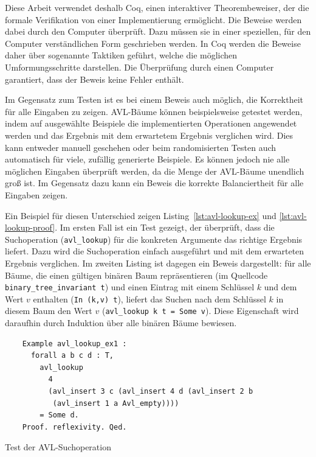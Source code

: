 \documentclass[a4paper, parskip]{scrartcl}
\begin{document}
Diese Arbeit verwendet deshalb Coq, einen interaktiver Theorembeweiser, der die formale Verifikation von einer Implementierung ermöglicht.
Die Beweise werden dabei durch den Computer überprüft.
Dazu müssen sie in einer speziellen, für den Computer verständlichen Form geschrieben werden.
In Coq werden die Beweise daher über sogenannte Taktiken geführt, welche die möglichen Umformungsschritte darstellen.
Die Überprüfung durch einen Computer garantiert, dass der Beweis keine Fehler enthält.

Im Gegensatz zum Testen ist es bei einem Beweis auch möglich, die Korrektheit für alle Eingaben zu zeigen.
AVL-Bäume können beispielsweise getestet werden, indem auf ausgewählte Beispiele die implementierten Operationen angewendet werden und das Ergebnis mit dem erwartetem Ergebnis verglichen wird.
Dies kann entweder manuell geschehen oder beim randomisierten Testen auch automatisch für viele, zufällig generierte Beispiele.
Es können jedoch nie alle möglichen Eingaben überprüft werden, da die Menge der AVL-Bäume unendlich groß ist.
Im Gegensatz dazu kann ein Beweis die korrekte Balanciertheit für alle Eingaben zeigen.

Ein Beispiel für diesen Unterschied zeigen Listing~\ref{lst:avl-lookup-ex} und \ref{lst:avl-lookup-proof}. 
Im ersten Fall ist ein Test gezeigt, der überprüft, dass die Suchoperation (\verb|avl_lookup|) für die konkreten Argumente das richtige Ergebnis liefert. 
Dazu wird die Suchoperation einfach ausgeführt und mit dem erwarteten Ergebnis verglichen.
Im zweiten Listing ist dagegen ein Beweis dargestellt: für alle Bäume, die einen gültigen binären Baum repräsentieren (im Quellcode \verb|binary_tree_invariant t|) und einen Eintrag mit einem Schlüssel $k$ und dem Wert $v$ enthalten (\verb|In (k,v) t|), liefert das Suchen nach dem Schlüssel $k$ in diesem Baum den Wert $v$ (\verb|avl_lookup k t = Some v|).
Diese Eigenschaft wird daraufhin durch Induktion über alle binären Bäume bewiesen.

\begin{listing}
  \begin{verbatim}
    Example avl_lookup_ex1 :
      forall a b c d : T,
        avl_lookup
          4
          (avl_insert 3 c (avl_insert 4 d (avl_insert 2 b 
           (avl_insert 1 a Avl_empty))))
        = Some d.
    Proof. reflexivity. Qed.
  \end{verbatim}
  \caption{Test der AVL-Suchoperation}
  \label{lst:avl-lookup-ex}
\end{listing}
\end{document}
